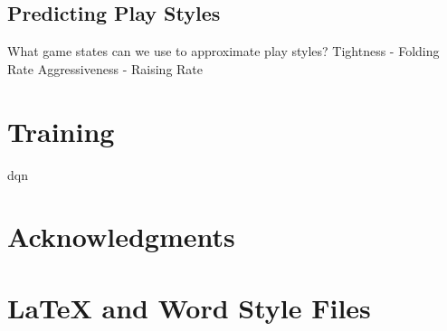 \documentclass{article}
\begin{document}
\subsection{Predicting Play Styles}

What game states can we use to approximate play styles?
Tightness - Folding Rate
Aggressiveness - Raising Rate

\section{Training}

dqn


\section*{Acknowledgments}

\appendix

\section{\LaTeX{} and Word Style Files}\label{stylefiles}



\end{document}

